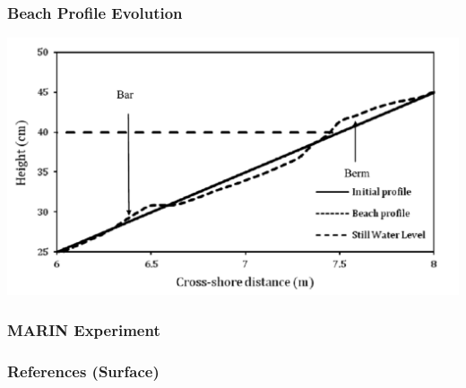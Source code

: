 \documentclass{beamer}
\begin{document}
\begin{frame}
\frametitle{Beach Profile Evolution}
\includegraphics[width=\textwidth,keepaspectratio=true]{beachProfile.pdf}
\end{frame}

\begin{frame}
\frametitle{MARIN Experiment}
\end{frame}

\begin{frame}
\frametitle{References (Surface)}

\tiny{}
\end{frame}
\end{document}
